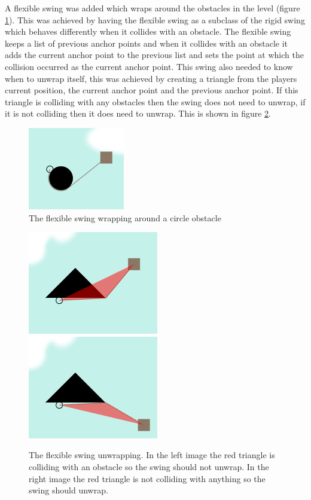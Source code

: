 \documentclass[]{report}
\begin{document}
			A flexible swing was added which wraps around the obstacles in the level (figure \ref{swingWrap}). This was achieved by having the flexible swing as a subclass of the rigid swing which behaves differently when it collides with an obstacle. The flexible swing keeps a list of previous anchor points and when it collides with an obstacle it adds the current anchor point to the previous list and sets the point at which the collision occurred as the current anchor point. This swing also needed to know when to unwrap itself, this was achieved by creating a triangle from the players current position, the current anchor point and the previous anchor point. If this triangle is colliding with any obstacles then the swing does not need to unwrap, if it is not colliding then it does need to unwrap. This is shown in figure \ref{swingUnwrap}.
			
			\begin{figure}[H]
				\centering
				\includegraphics{swingWrap}
				\caption{The flexible swing wrapping around a circle obstacle}
				\label{swingWrap}
			\end{figure}
			
			\begin{figure}[H]
				\centering
				\includegraphics[scale=0.6]{swingUnwrapNo}
				\includegraphics[scale=0.6]{swingUnwrapYes}
				\caption{The flexible swing unwrapping. In the left image the red triangle is colliding with an obstacle so the swing should not unwrap. In the right image the red triangle is not colliding with anything so the swing should unwrap.}
				\label{swingUnwrap}
			\end{figure}
			
\end{document}
